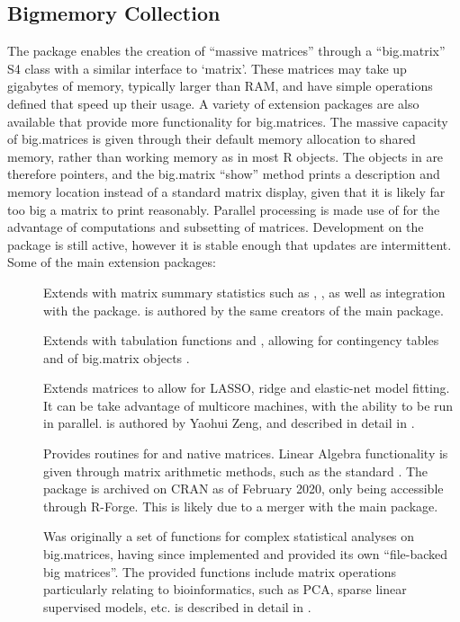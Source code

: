 \subsection{Bigmemory Collection}\label{subsec:bigmemory-collection}

The  package enables the creation of ``massive matrices'' through a ``big.matrix'' S4 class with a similar interface to `matrix'\cite{kane13:bigmemory}.
These matrices may take up gigabytes of memory, typically larger than RAM, and have simple operations defined that speed up their usage.
A variety of extension packages are also available that provide more functionality for big.matrices.
The massive capacity of big.matrices is given through their default memory allocation to shared memory, rather than working memory as in most R objects.
The objects in \R{} are therefore pointers, and the big.matrix ``show'' method prints a description and memory location instead of a standard matrix display, given that it is likely far too big a matrix to print reasonably.
Parallel processing is made use of for the advantage of computations and subsetting of matrices.
Development on the package is still active, however it is stable enough that updates are intermittent.
Some of the main extension packages:

\begin{description} \item[] Extends  with matrix summary statistics such as , , as well as integration with the  package\cite{emerson16}.
		 is authored by the same creators
		of the main  package.
	\item[]
		Extends  with tabulation functions and ,
		allowing for contingency tables and  of big.matrix
		objects \cite{kane16}.
	\item[]
		Extends  matrices to allow for LASSO, ridge and elastic-net
		model fitting.
		It can be take advantage of multicore machines, with the ability to be run in parallel.
		 is authored by Yaohui Zeng, and
		described in detail in \textcite{zeng2017biglasso}.
	\item[]
		Provides  routines for  and native \R{} matrices.
		Linear Algebra functionality is given through matrix arithmetic methods, such as the standard .
		The package is archived on CRAN as of February 2020, only being accessible through R-Forge.
		This is likely due to a merger with the main  package.
	\item[]
		Was originally a set of functions for complex statistical analyses on
		big.matrices, having since implemented and provided its own
		``file-backed big matrices''\cite{prive2018efficient}.
		The provided functions include matrix operations particularly relating to bioinformatics, such as PCA, sparse linear supervised models, etc.  is described in detail in \textcite{prive2018efficient}.
\end{description}

